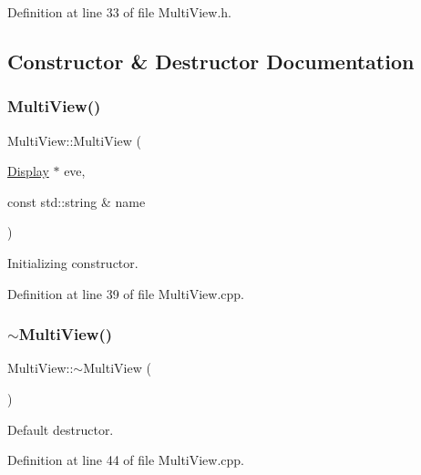 Definition at line 33 of file Multi\+View.\+h.



\subsection{Constructor \& Destructor Documentation}
\hypertarget{class_d_d4hep_1_1_multi_view_ad9a1e2b93bc146e75fe38f437a075fe6}{}\label{class_d_d4hep_1_1_multi_view_ad9a1e2b93bc146e75fe38f437a075fe6} 
\subsubsection{\texorpdfstring{Multi\+View()}{MultiView()}}
{\footnotesize\ttfamily Multi\+View\+::\+Multi\+View (\begin{DoxyParamCaption}\item[{\hyperlink{class_d_d4hep_1_1_display}{Display} $\ast$}]{eve,  }\item[{const std\+::string \&}]{name }\end{DoxyParamCaption})}



Initializing constructor. 



Definition at line 39 of file Multi\+View.\+cpp.

\hypertarget{class_d_d4hep_1_1_multi_view_a3099211ad2f32090dd83aa6c7447db9f}{}\label{class_d_d4hep_1_1_multi_view_a3099211ad2f32090dd83aa6c7447db9f} 
\subsubsection{\texorpdfstring{$\sim$\+Multi\+View()}{~MultiView()}}
{\footnotesize\ttfamily Multi\+View\+::$\sim$\+Multi\+View (\begin{DoxyParamCaption}{ }\end{DoxyParamCaption})\hspace{0.3cm}{\ttfamily [virtual]}}



Default destructor. 



Definition at line 44 of file Multi\+View.\+cpp.



